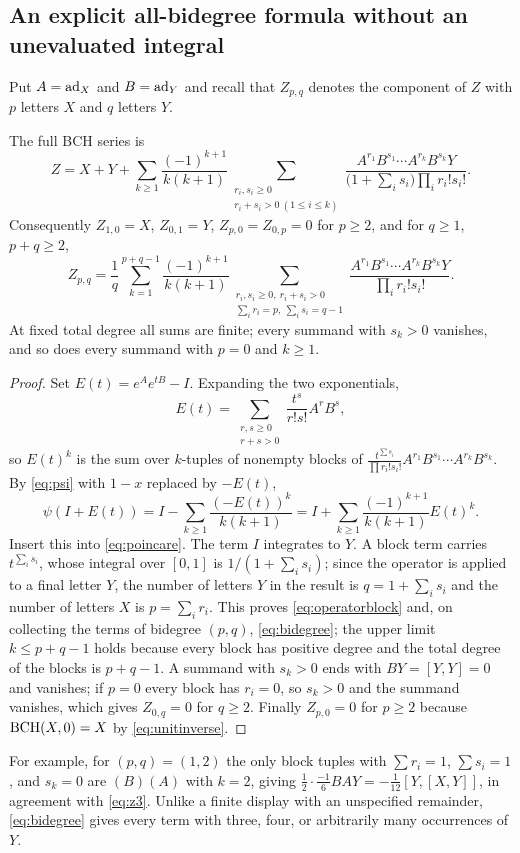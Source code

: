 \subsection{An explicit all-bidegree formula without an unevaluated integral}
Put $A=\operatorname{ad}_X$ and $B=\operatorname{ad}_Y$ and recall that $Z_{p,q}$ denotes the component
of $Z$ with $p$ letters $X$ and $q$ letters $Y$.
\begin{theorem}\label{thm:operatorblock}
The full BCH series is
\begin{equation}\label{eq:operatorblock}
 \boxed{\displaystyle
 Z=X+Y+\sum_{k\geq1}\frac{(-1)^{k+1}}{k(k+1)}
 \sum_{\substack{r_i,s_i\geq0\\r_i+s_i>0\ (1\leq i\leq k)}}
 \frac{A^{r_1}B^{s_1}\cdots A^{r_k}B^{s_k}Y}
 {\bigl(1+\sum_is_i\bigr)\prod_ir_i!s_i!}.}
\end{equation}
Consequently $Z_{1,0}=X$, $Z_{0,1}=Y$, $Z_{p,0}=Z_{0,p}=0$ for $p\geq2$, and
for $q\geq1$, $p+q\geq2$,
\begin{equation}\label{eq:bidegree}
 \boxed{\displaystyle
 Z_{p,q}=\frac1q\sum_{k=1}^{p+q-1}\frac{(-1)^{k+1}}{k(k+1)}
 \sum_{\substack{r_i,s_i\geq0,\ r_i+s_i>0\\
                   \sum_ir_i=p,\ \sum_is_i=q-1}}
 \frac{A^{r_1}B^{s_1}\cdots A^{r_k}B^{s_k}Y}{\prod_ir_i!s_i!}.}
\end{equation}
At fixed total degree all sums are finite; every summand with $s_k>0$
vanishes, and so does every summand with $p=0$ and $k\geq1$.
\end{theorem}
\begin{proof}
Set $E(t)=e^Ae^{tB}-I$. Expanding the two exponentials,
\[
 E(t)=\sum_{\substack{r,s\geq0\\r+s>0}}\frac{t^s}{r!s!}A^rB^s,
\]
so $E(t)^k$ is the sum over $k$-tuples of nonempty blocks of
$\frac{t^{\sum s_i}}{\prod r_i!s_i!}A^{r_1}B^{s_1}\cdots A^{r_k}B^{s_k}$.
By \eqref{eq:psi} with $1-x$ replaced by $-E(t)$,
\[
 \psi(I+E(t))=I-\sum_{k\geq1}\frac{(-E(t))^k}{k(k+1)}
 =I+\sum_{k\geq1}\frac{(-1)^{k+1}}{k(k+1)}E(t)^k.
\]
Insert this into \eqref{eq:poincare}. The term $I$ integrates to $Y$. A
block term carries $t^{\sum_is_i}$, whose integral over $[0,1]$ is
$1/(1+\sum_is_i)$; since the operator is applied to a final letter $Y$, the
number of letters $Y$ in the result is $q=1+\sum_is_i$ and the number of
letters $X$ is $p=\sum_ir_i$. This proves \eqref{eq:operatorblock} and, on
collecting the terms of bidegree $(p,q)$, \eqref{eq:bidegree}; the upper
limit $k\leq p+q-1$ holds because every block has positive degree and the
total degree of the blocks is $p+q-1$. A summand with $s_k>0$ ends with
$BY=[Y,Y]=0$ and vanishes; if $p=0$ every block has $r_i=0$, so $s_k>0$ and
the summand vanishes, which gives $Z_{0,q}=0$ for $q\geq2$. Finally
$Z_{p,0}=0$ for $p\geq2$ because $\operatorname{BCH}(X,0)=X$ by \eqref{eq:unitinverse}.
\end{proof}
For example, for $(p,q)=(1,2)$ the only block tuples with
$\sum r_i=1$, $\sum s_i=1$, and $s_k=0$ are $(B)(A)$ with $k=2$, giving
$\frac{1}{2}\cdot\frac{-1}{6}BAY=-\frac1{12}[Y,[X,Y]]$, in agreement with
\eqref{eq:z3}. Unlike a finite display with an unspecified remainder,
\eqref{eq:bidegree} gives every term with three, four, or arbitrarily many
occurrences of $Y$.

